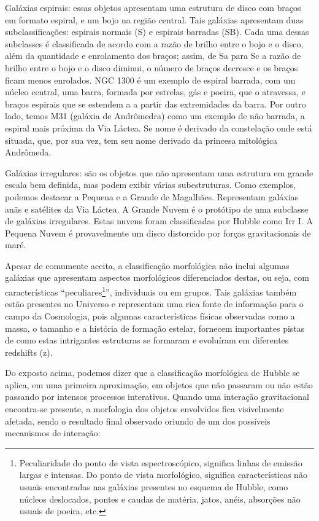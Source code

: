 Galáxias espirais: essas objetos apresentam uma estrutura de disco com
braços em formato espiral, e um bojo na região central. Tais galáxias 
apresentam duas subclassificações: espirais normais (S) e espirais barradas (SB). Cada uma dessas subclasses é classificada de acordo com a razão de brilho entre o bojo e o disco, além da quantidade e enrolamento dos braços; assim, de Sa para Sc a razão de brilho entre o bojo e o disco diminui, o número de braços decresce e os braços ficam menos enrolados. NGC 1300 é um exemplo de espiral barrada, com um núcleo central, uma barra, formada por estrelas, gás e poeira, que o atravessa, e braços espirais que se estendem a a partir das extremidades da barra. Por outro lado, temos M31 (galáxia de Andrômedra) como um exemplo de não barrada, a espiral mais próxima da Via Láctea. Se nome é derivado da constelação onde está situada, que, por sua vez, tem seu nome derivado da princesa mitológica Andrômeda. 

Galáxias irregulares: são os objetos que não apresentam uma estrutura em
grande escala bem definida, mas podem exibir várias subestruturas. Como exemplos, podemos destacar a Pequena e a Grande de Magalhães. Representam galáxias anãs e satélites da Via Láctea. A Grande Nuvem é o protótipo de uma subclasse de galáxias irregulares. Estas nuvens foram classificadas por Hubble como Irr I. A Pequena Nuvem é provavelmente um disco distorcido por forças gravitacionais de maré. 

Apesar de comumente aceita, a classificação morfológica não inclui algumas galáxias que apresentam aspectos morfológicos diferenciados destas, ou seja, com características “peculiares\footnote{Peculiaridade do ponto de vista espectroscópico, significa linhas de emissão largas e intensas. Do ponto de vista morfológico, significa características não usuais encontradas nas galáxias presentes no esquema de Hubble, como núcleos deslocados, pontes e caudas de matéria, jatos, anéis, absorções não usuais de poeira, etc.}”, individuais ou em grupos. Tais galáxias também estão presentes no Universo e representam uma rica fonte de informação para o campo da Cosmologia, pois algumas características físicas observadas como a massa, o tamanho e a história de formação estelar, fornecem importantes pistas de como estas intrigantes estruturas se formaram e evoluíram em diferentes redshifts (z).

Do exposto acima, podemos dizer que a classificação morfológica de Hubble se aplica, em uma primeira aproximação, em objetos que não passaram ou não estão passando por intensos processos interativos. Quando uma interação gravitacional encontra-se presente, a morfologia dos objetos envolvidos fica visivelmente afetada, sendo o resultado final observado oriundo de um dos possíveis mecanismos de interação:

